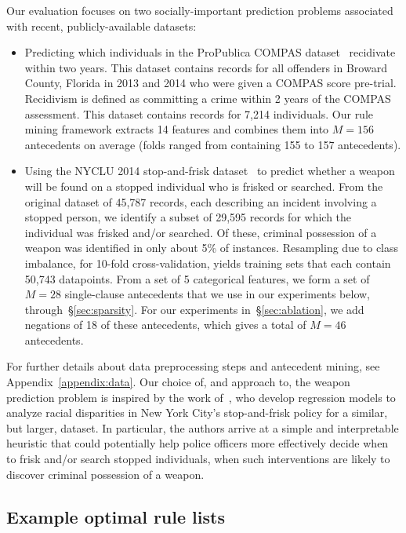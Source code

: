 Our evaluation focuses on two socially-important prediction problems associated
with recent, publicly-available datasets:
\begin{itemize}
\item Predicting which individuals in the ProPublica COMPAS
dataset~\citep{LarsonMaKiAn16} recidivate within two years.
This dataset contains records for all offenders in Broward County, Florida
in 2013 and 2014 who were given a COMPAS score pre-trial.
Recidivism is defined as committing a crime within 2 years of the COMPAS
assessment.
This dataset contains records for 7,214 individuals.
%
Our rule mining framework extracts 14 features and combines them into
${M=156}$ antecedents on average (folds ranged from containing 155 to 157 antecedents).
%
\item Using the NYCLU 2014 stop-and-frisk dataset~\citep{nyclu:2014} to predict
whether a weapon will be found on a stopped individual who is frisked or searched.
%
From the original dataset of 45,787 records, each describing an incident involving
a stopped person, we identify a subset of 29,595 records for which the individual
was frisked and/or searched.
%
Of these, criminal possession of a weapon was identified in only about 5\% of instances.
%
Resampling due to class imbalance, for 10-fold cross-validation, yields training sets
that each contain 50,743 datapoints.
%
From a set of 5 categorical features, we form a set of ${M=28}$ single-clause antecedents
that we use in our experiments below, through~\S\ref{sec:sparsity}.
%
For our experiments in~\S\ref{sec:ablation}, we add negations of 18 of these antecedents,
which gives a total of ${M=46}$ antecedents.
\end{itemize}
%
For further details about data preprocessing steps and antecedent mining,
see Appendix~\ref{appendix:data}.
%
Our choice of, and approach to, the weapon prediction problem is inspired by the work
of~\citet{Goel16}, who develop regression models to analyze racial disparities
in New York City's stop-and-frisk policy for a similar, but larger, dataset.
%
In particular, the authors arrive at a simple and interpretable heuristic that
could potentially help police officers more effectively decide when to
frisk and/or search stopped individuals, \ie when such
interventions are likely to discover criminal possession of a weapon.

\subsection{Example optimal rule lists}
\label{sec:examples}

